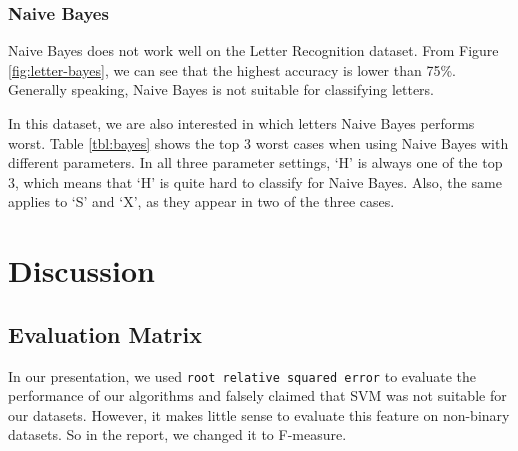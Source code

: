\documentclass[11pt]{article}
\begin{document}

\newpage

\subsubsection{Naive Bayes}
Naive Bayes does not work well on the Letter Recognition dataset. From Figure \ref{fig:letter-bayes}, we can see that the highest accuracy is lower than 75\%. Generally speaking, Naive Bayes is not suitable for classifying letters.

In this dataset, we are also interested in which letters Naive Bayes performs worst. Table \ref{tbl:bayes} shows the top 3 worst cases when using Naive Bayes with different parameters. In all three parameter settings, `H' is always one of the top 3, which means that `H' is quite hard to classify for Naive Bayes. Also, the same applies to `S' and `X', as they appear in two of the three cases.



\section{Discussion}

\subsection{Evaluation Matrix}
In our presentation, we used \texttt{root relative squared error} to evaluate the performance of our algorithms and falsely claimed that SVM was not suitable for our datasets. However, it makes little sense to evaluate this feature on  non-binary datasets. So in the report, we changed it to F-measure.
\end{document}
